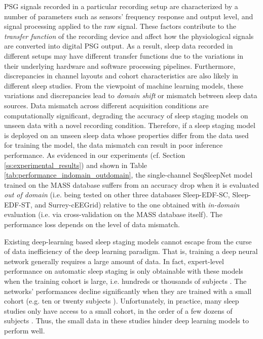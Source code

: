 \documentclass[journal,twoside,web]{ieeecolor}
\begin{document}
 PSG signals recorded in a particular recording setup are characterized by a number of parameters such as sensors' frequency response and output level, and signal processing applied to the raw signal. These factors contribute to the \emph{transfer function} of the recording device and affect how the physiological signals are converted into digital PSG output. As a result, sleep data recorded in different setups may have different transfer functions due to the variations in their underlying hardware and software processing pipelines. Furthermore, discrepancies in channel layouts \cite{Stephansen2018} and cohort characteristics \cite{Cooray2019} are also likely in different sleep studies. From the viewpoint of machine learning models, these variations and discrepancies lead to \emph{domain shift} or mismatch between sleep data sources. Data mismatch across different acquisition conditions are computationally significant, degrading the accuracy of sleep staging models on unseen data with a novel recording condition. Therefore, if a sleep staging model is deployed on an unseen sleep data whose properties differ from the data used for training the model, the data mismatch can result in poor inference performance. As evidenced in our experiments (cf. Section \ref{ss:experimental_results}) and shown in Table \ref{tab:performance_indomain_outdomain}, the single-channel SeqSleepNet \cite{Phan2019a} model trained on the MASS database suffers from an accuracy drop when it is evaluated \emph{out of domain} (i.e. being tested on other three databases Sleep-EDF-SC, Sleep-EDF-ST, and Surrey-cEEGrid) relative to the one obtained with \emph{in-domain} evaluation (i.e. via cross-validation on the MASS database itself). The performance loss depends on the level of data mismatch.

 Existing deep-learning based sleep staging models cannot escape from the curse of data inefficiency of the deep learning paradigm. That is, training a deep neural network generally requires a large amount of data. In fact, expert-level performance on automatic sleep staging is only obtainable with these models when the training cohort is large, i.e. hundreds or thousands of subjects \cite{Phan2019a, Stephansen2018}. The networks' performances decline significantly when they are trained with a small cohort (e.g. ten or twenty subjects \cite{Phan2019c, Supratak2017}). Unfortunately, in practice, many sleep studies only have access to a small cohort, in the order of a few dozens of subjects \cite{Kemp2000, Goldberger2000, Olesen2016, Cooray2019,Andreotti2018, Mikkelsen2019}. Thus, the small data in these studies hinder deep learning models to perform well. 
\end{document}
